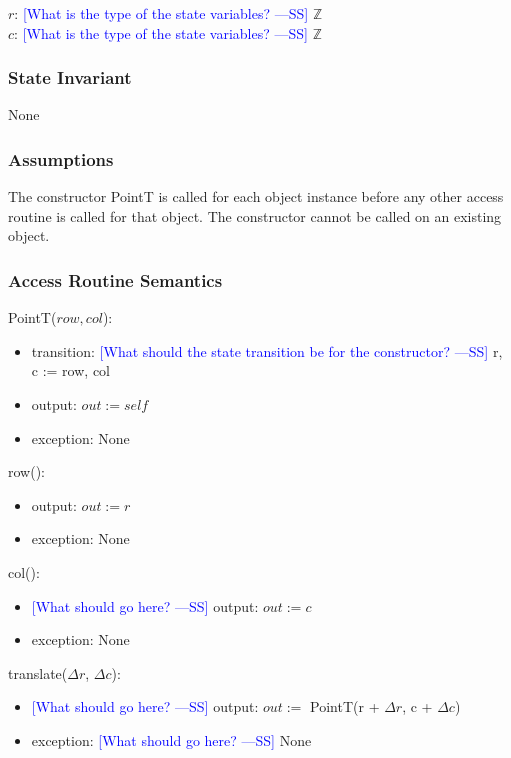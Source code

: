 \documentclass[12pt]{article}
\newcommand{\authornote}[3]{\textcolor{#1}{[#3 ---#2]}}
\newcommand{\authornote}[3]{}
\newcommand{\wss}[1]{\authornote{blue}{SS}{#1}}
\begin{document}
$r$: \wss{What is the type of the state variables?} $\mathbb{Z}$\\
$c$: \wss{What is the type of the state variables?} $\mathbb{Z}$\\

\subsubsection* {State Invariant}

None

\subsubsection* {Assumptions}

The constructor PointT is called for each object instance before any other
access routine is called for that object.  The constructor cannot be called on
an existing object.

\subsubsection* {Access Routine Semantics}

PointT($row, col$):
\begin{itemize}
\item transition: \wss{What should the state transition be for the constructor?} r, c := row, col
\item output: $out := \mathit{self}$
\item exception: None
\end{itemize}

\noindent row():
\begin{itemize}
\item output: $out := r$
\item exception: None
\end{itemize}

\noindent col():
\begin{itemize}
\item \wss{What should go here?} output: $out := c$
\item exception: None
\end{itemize}

\noindent translate($\Delta r$, $\Delta c$):
\begin{itemize}
\item \wss{What should go here?} output: $out :=$ PointT(r + $\Delta r$, c + $\Delta c$)
\item exception: \wss{What should go here?} None
\end{itemize}
\end{document}
